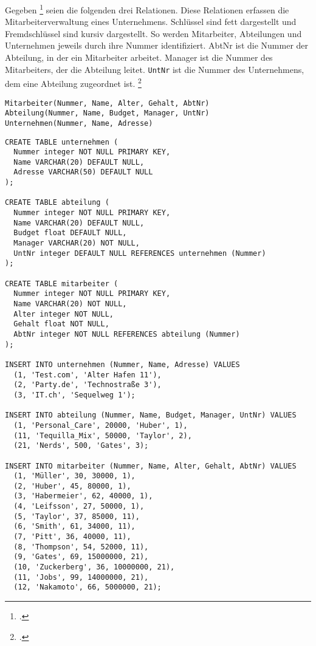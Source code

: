 \documentclass{bschlangaul-aufgabe}
\begin{document}

Gegeben \footcite[Thema 1 Aufgabe 5]{66113:2003:03} seien die
folgenden drei Relationen. Diese Relationen erfassen die
Mitarbeiterverwaltung eines Unternehmens. Schlüssel sind fett
dargestellt und Fremdschlüssel sind kursiv dargestellt. So werden
Mitarbeiter, Abteilungen und Unternehmen jeweils durch ihre Nummer
identifiziert. AbtNr ist die Nummer der Abteilung, in der ein
Mitarbeiter arbeitet. Manager ist die Nummer des Mitarbeiters, der die
Abteilung leitet. \verb|UntNr| ist die Nummer des Unternehmens, dem eine
Abteilung zugeordnet ist.
\footcite[Aufgabe 2: SQL]{db:pu:2}

\begin{verbatim}
Mitarbeiter(Nummer, Name, Alter, Gehalt, AbtNr)
Abteilung(Nummer, Name, Budget, Manager, UntNr)
Unternehmen(Nummer, Name, Adresse)
\end{verbatim}

\begin{verbatim}
CREATE TABLE unternehmen (
  Nummer integer NOT NULL PRIMARY KEY,
  Name VARCHAR(20) DEFAULT NULL,
  Adresse VARCHAR(50) DEFAULT NULL
);

CREATE TABLE abteilung (
  Nummer integer NOT NULL PRIMARY KEY,
  Name VARCHAR(20) DEFAULT NULL,
  Budget float DEFAULT NULL,
  Manager VARCHAR(20) NOT NULL,
  UntNr integer DEFAULT NULL REFERENCES unternehmen (Nummer)
);

CREATE TABLE mitarbeiter (
  Nummer integer NOT NULL PRIMARY KEY,
  Name VARCHAR(20) NOT NULL,
  Alter integer NOT NULL,
  Gehalt float NOT NULL,
  AbtNr integer NOT NULL REFERENCES abteilung (Nummer)
);

INSERT INTO unternehmen (Nummer, Name, Adresse) VALUES
  (1, 'Test.com', 'Alter Hafen 11'),
  (2, 'Party.de', 'Technostraße 3'),
  (3, 'IT.ch', 'Sequelweg 1');

INSERT INTO abteilung (Nummer, Name, Budget, Manager, UntNr) VALUES
  (1, 'Personal_Care', 20000, 'Huber', 1),
  (11, 'Tequilla_Mix', 50000, 'Taylor', 2),
  (21, 'Nerds', 500, 'Gates', 3);

INSERT INTO mitarbeiter (Nummer, Name, Alter, Gehalt, AbtNr) VALUES
  (1, 'Müller', 30, 30000, 1),
  (2, 'Huber', 45, 80000, 1),
  (3, 'Habermeier', 62, 40000, 1),
  (4, 'Leifsson', 27, 50000, 1),
  (5, 'Taylor', 37, 85000, 11),
  (6, 'Smith', 61, 34000, 11),
  (7, 'Pitt', 36, 40000, 11),
  (8, 'Thompson', 54, 52000, 11),
  (9, 'Gates', 69, 15000000, 21),
  (10, 'Zuckerberg', 36, 10000000, 21),
  (11, 'Jobs', 99, 14000000, 21),
  (12, 'Nakamoto', 66, 5000000, 21);
\end{verbatim}
\end{document}
